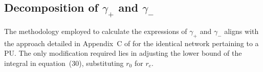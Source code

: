 {\subsection{Decomposition of $\gamma_+$ and $\gamma_-$}
\label{ssec:decomposition4}
The methodology employed to calculate the expressions of $\gamma_+$ and $\gamma_-$ aligns with the approach detailed in Appendix~C of \cite{GontierMeta} for the identical network pertaining to a PU. The only modification required lies in adjusting the lower bound of the integral in equation~(30), substituting $r_0$ for $r_e$.

























}






\vfill




